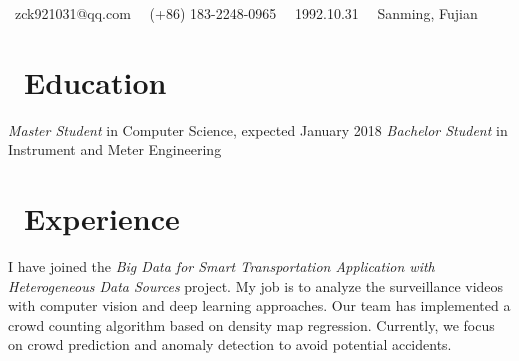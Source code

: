 \documentclass{resume}
\begin{document}
\centerline{\sffamily\large{\faEnvelope\ {zck921031@qq.com} \textperiodcentered\ \faPhone\ {(+86) 183-2248-0965} \textperiodcentered\ \faBirthdayCake\ {1992.10.31} \textperiodcentered\ \faHome\ {Sanming, Fujian}}
\vspace{1.5ex} }
 
\section{\faGraduationCap\  Education}
\textit{Master Student} in Computer Science, expected January 2018
\textit{Bachelor Student} in Instrument and Meter Engineering

\section{\faUsers\ Experience}
I have joined the \textsl{Big Data for Smart Transportation Application with Heterogeneous Data Sources} project.
My job is to analyze the surveillance videos with computer vision and deep learning approaches.
Our team has implemented a crowd counting algorithm based on density map regression.
Currently, we focus on crowd prediction and anomaly detection to avoid potential accidents.
\end{document}
